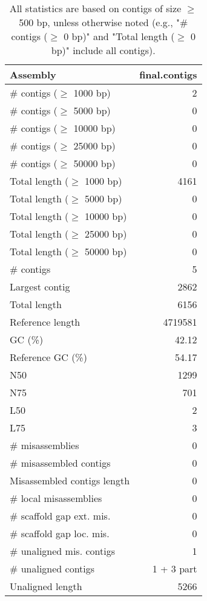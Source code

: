 \documentclass[12pt,a4paper]{article}
\begin{document}
\begin{table}[ht]
\begin{center}
\caption{All statistics are based on contigs of size $\geq$ 500 bp, unless otherwise noted (e.g., "\# contigs ($\geq$ 0 bp)" and "Total length ($\geq$ 0 bp)" include all contigs).}
\begin{tabular}{|l*{1}{|r}|}
\hline
Assembly & final.contigs \\ \hline
\# contigs ($\geq$ 1000 bp) & 2 \\ \hline
\# contigs ($\geq$ 5000 bp) & 0 \\ \hline
\# contigs ($\geq$ 10000 bp) & 0 \\ \hline
\# contigs ($\geq$ 25000 bp) & 0 \\ \hline
\# contigs ($\geq$ 50000 bp) & 0 \\ \hline
Total length ($\geq$ 1000 bp) & 4161 \\ \hline
Total length ($\geq$ 5000 bp) & 0 \\ \hline
Total length ($\geq$ 10000 bp) & 0 \\ \hline
Total length ($\geq$ 25000 bp) & 0 \\ \hline
Total length ($\geq$ 50000 bp) & 0 \\ \hline
\# contigs & 5 \\ \hline
Largest contig & 2862 \\ \hline
Total length & 6156 \\ \hline
Reference length & 4719581 \\ \hline
GC (\%) & 42.12 \\ \hline
Reference GC (\%) & 54.17 \\ \hline
N50 & 1299 \\ \hline
N75 & 701 \\ \hline
L50 & 2 \\ \hline
L75 & 3 \\ \hline
\# misassemblies & 0 \\ \hline
\# misassembled contigs & 0 \\ \hline
Misassembled contigs length & 0 \\ \hline
\# local misassemblies & 0 \\ \hline
\# scaffold gap ext. mis. & 0 \\ \hline
\# scaffold gap loc. mis. & 0 \\ \hline
\# unaligned mis. contigs & 1 \\ \hline
\# unaligned contigs & 1 + 3 part \\ \hline
Unaligned length & 5266 \\ \hline

\end{tabular}
\end{center}
\end{table}
\end{document}
